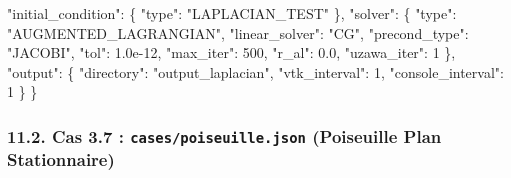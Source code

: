 \documentclass[
  french,
]{article}
\newenvironment{Shaded}{}{}
\newcommand{\DataTypeTok}[1]{\textcolor[rgb]{0.56,0.13,0.00}{#1}}
\newcommand{\DecValTok}[1]{\textcolor[rgb]{0.25,0.63,0.44}{#1}}
\newcommand{\FloatTok}[1]{\textcolor[rgb]{0.25,0.63,0.44}{#1}}
\newcommand{\FunctionTok}[1]{\textcolor[rgb]{0.02,0.16,0.49}{#1}}
\newcommand{\StringTok}[1]{\textcolor[rgb]{0.25,0.44,0.63}{#1}}
\begin{document}
\begin{Shaded}
\begin{Highlighting}[]
  \DataTypeTok{"initial\_condition"}\FunctionTok{:} \FunctionTok{\{} \DataTypeTok{"type"}\FunctionTok{:} \StringTok{"LAPLACIAN\_TEST"} \FunctionTok{\},}
  \DataTypeTok{"solver"}\FunctionTok{:} \FunctionTok{\{}
    \DataTypeTok{"type"}\FunctionTok{:} \StringTok{"AUGMENTED\_LAGRANGIAN"}\FunctionTok{,}
    \DataTypeTok{"linear\_solver"}\FunctionTok{:} \StringTok{"CG"}\FunctionTok{,}
    \DataTypeTok{"precond\_type"}\FunctionTok{:} \StringTok{"JACOBI"}\FunctionTok{,}
    \DataTypeTok{"tol"}\FunctionTok{:} \FloatTok{1.0e{-}12}\FunctionTok{,} \DataTypeTok{"max\_iter"}\FunctionTok{:} \DecValTok{500}\FunctionTok{,} \DataTypeTok{"r\_al"}\FunctionTok{:} \FloatTok{0.0}\FunctionTok{,} \DataTypeTok{"uzawa\_iter"}\FunctionTok{:} \DecValTok{1}
  \FunctionTok{\},}
  \DataTypeTok{"output"}\FunctionTok{:} \FunctionTok{\{} \DataTypeTok{"directory"}\FunctionTok{:} \StringTok{"output\_laplacian"}\FunctionTok{,} \DataTypeTok{"vtk\_interval"}\FunctionTok{:} \DecValTok{1}\FunctionTok{,} \DataTypeTok{"console\_interval"}\FunctionTok{:} \DecValTok{1} \FunctionTok{\}}
\FunctionTok{\}}
\end{Highlighting}
\end{Shaded}

\subsubsection{\texorpdfstring{11.2. Cas 3.7 :
\texttt{cases/poiseuille.json} (Poiseuille Plan
Stationnaire)}{11.2. Cas 3.7 : cases/poiseuille.json (Poiseuille Plan Stationnaire)}}\label{cas-3.7-casespoiseuille.json-poiseuille-plan-stationnaire}
\end{document}

